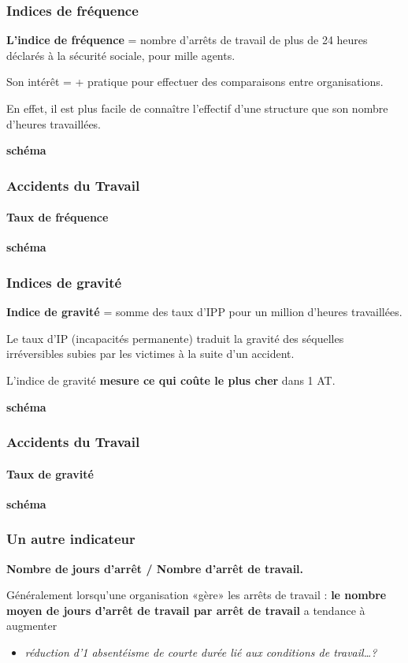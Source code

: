 \documentclass{beamer}
\begin{document}
\begin{frame}
\frametitle{Indices de fréquence}

\textbf{L’indice de fréquence }= nombre d’arrêts de travail de plus de 24 heures déclarés à la sécurité sociale, pour mille agents.

Son intérêt = + pratique pour effectuer des comparaisons entre organisations.

En effet, il est plus facile de connaître l’effectif  d’une structure que son nombre d’heures travaillées.


\textbf{schéma}
\end{frame}

\begin{frame}
\frametitle{Accidents du Travail}
\framesubtitle{Taux de fréquence}

\textbf{schéma}
\end{frame}


\begin{frame}
\frametitle{Indices de gravité}

\textbf{Indice de gravité} = somme des taux d’IPP pour un million d’heures travaillées.

Le taux d’IP (incapacités permanente) traduit la gravité des séquelles irréversibles subies par les victimes à la suite d’un accident.

L’indice de gravité \textbf{mesure ce qui coûte le plus cher} dans 1 AT.

\textbf{schéma}
\end{frame}

\begin{frame}
\frametitle{Accidents du Travail}
\framesubtitle{Taux de gravité}

\textbf{schéma}
\end{frame}


\begin{frame}
\frametitle{Un autre indicateur}

\textbf{Nombre de jours d’arrêt / Nombre d’arrêt de travail. }

Généralement lorsqu’une organisation «gère» les arrêts de travail : \textbf{le nombre moyen de jours d’arrêt de travail par arrêt de travail} a tendance à augmenter 
\begin{itemize}
\item \textit{réduction d’1 absentéisme de courte durée lié aux conditions de travail…?}
\end{itemize}
\end{frame}
\end{document}

